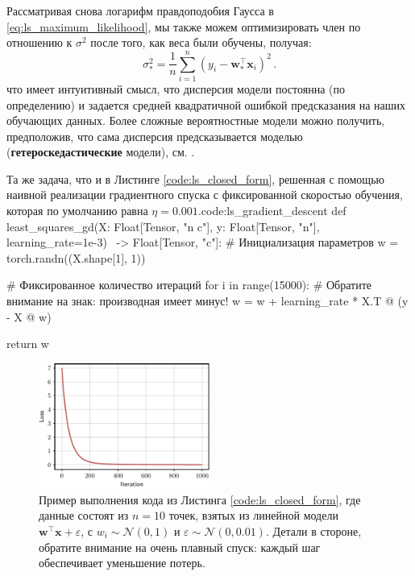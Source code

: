 Рассматривая снова логарифм правдоподобия Гаусса в \eqref{eq:ls_maximum_likelihood}, мы также можем оптимизировать член по отношению к $\sigma^2$ после того, как веса были обучены, получая:
%
\begin{equation}
\sigma_*^{2} = \frac{1}{n}\sum_{i=1}^n (y_i - \mathbf{w}_*^{\top}\mathbf{x}_i)^2 \,.
\label{eq:ls_sigma}
\end{equation}
%
что имеет интуитивный смысл, что дисперсия модели постоянна (по определению) и задается средней квадратичной ошибкой предсказания на наших обучающих данных. Более сложные вероятностные модели можно получить, предположив, что сама дисперсия предсказывается моделью (\textbf{гетероскедастические} модели), см. \cite{bishop2006pattern}.

\begin{mypy}{Та же задача, что и в Листинге \protect\ref{code:ls_closed_form}, решенная с помощью наивной реализации градиентного спуска с фиксированной скоростью обучения, которая по умолчанию равна $\eta = 0.001$.}{code:ls_gradient_descent}
def least_squares_gd(X: Float[Tensor, "n c"],
                     y: Float[Tensor, "n"],
                     learning_rate=1e-3) \
                     -> Float[Tensor, "c"]:
    # Инициализация параметров
    w = torch.randn((X.shape[1], 1))

    # Фиксированное количество итераций
    for i in range(15000):
      # Обратите внимание на знак: производная имеет минус!
      w = w + learning_rate * X.T @ (y - X @ w)

    return w
\end{mypy}

\begin{figure}
    \centering
    \hspace{1em} \includegraphics[width=0.5\textwidth]{images/least_squares_example.pdf}
    \caption{Пример выполнения кода из Листинга \ref{code:ls_closed_form}, где данные состоят из $n=10$ точек, взятых из линейной модели $\mathbf{w}^\top \mathbf{x} + \varepsilon$, с $w_i \sim \mathcal{N}(0, 1)$ и $\varepsilon \sim \mathcal{N}(0, 0.01)$. Детали в стороне, обратите внимание на очень плавный спуск: каждый шаг обеспечивает уменьшение потерь.}
    \label{fig:loss_evolution}
\end{figure}


